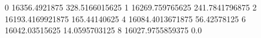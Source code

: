 0 16356.4921875 328.5166015625
1 16269.759765625 241.7841796875
2 16193.4169921875 165.44140625
4 16084.4013671875 56.42578125
6 16042.03515625 14.0595703125
8 16027.9755859375 0.0
